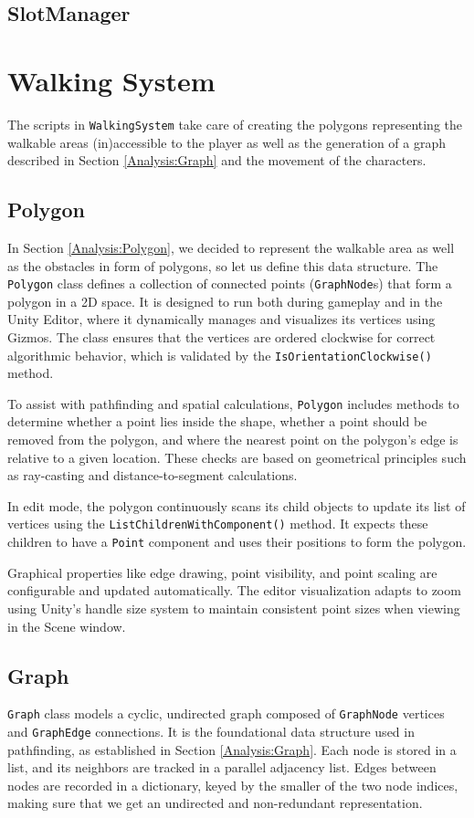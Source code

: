 \subsection{SlotManager}


\section{Walking System}
The scripts in \verb|WalkingSystem| take care of creating the polygons representing the walkable areas (in)accessible to the player as well as the generation of a graph described in Section \ref{Analysis:Graph} and the movement of the characters.

\subsection{Polygon}
In Section \ref{Analysis:Polygon}, we decided to represent the walkable area as well as the obstacles in form of polygons, so let us define this data structure. The \verb|Polygon| class defines a collection of connected points (\verb|GraphNode|s) that form a polygon in a 2D space. It is designed to run both during gameplay and in the Unity Editor, where it dynamically manages and visualizes its vertices using Gizmos. The class ensures that the vertices are ordered clockwise for correct algorithmic behavior, which is validated by the \verb|IsOrientationClockwise()| method.

To assist with pathfinding and spatial calculations, \verb|Polygon| includes methods to determine whether a point lies inside the shape, whether a point should be removed from the polygon, and where the nearest point on the polygon's edge is relative to a given location. These checks are based on geometrical principles such as ray-casting and distance-to-segment calculations.

In edit mode, the polygon continuously scans its child objects to update its list of vertices using the \verb|ListChildrenWithComponent()| method. It expects these children to have a \verb|Point| component and uses their positions to form the polygon.

Graphical properties like edge drawing, point visibility, and point scaling are configurable and updated automatically. The editor visualization adapts to zoom using Unity’s handle size system to maintain consistent point sizes when viewing in the Scene window.


\subsection{Graph}
\verb|Graph| class models a cyclic, undirected graph composed of \verb|GraphNode| vertices and \verb|GraphEdge| connections. It is the foundational data structure used in pathfinding, as established in Section \ref{Analysis:Graph}. Each node is stored in a list, and its neighbors are tracked in a parallel adjacency list. Edges between nodes are recorded in a dictionary, keyed by the smaller of the two node indices, making sure that we get an undirected and non-redundant representation.

